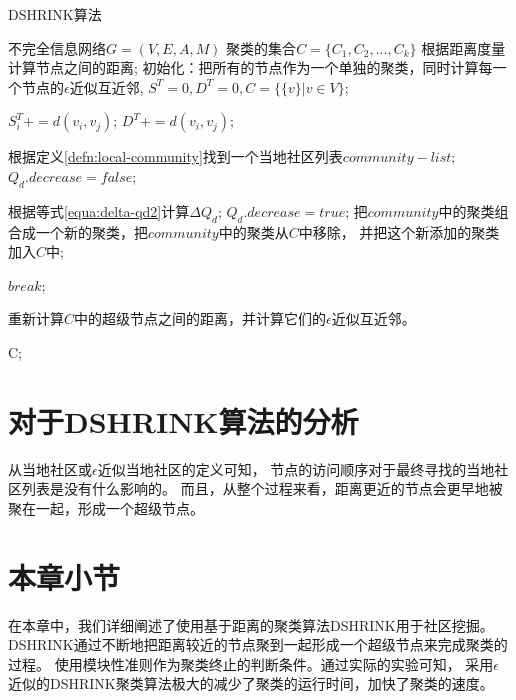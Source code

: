 \begin{algorithm}[htb]
    \caption{DSHRINK算法}
    \label{algo:dshrink}
    \begin{algorithmic}[1]
        \Require
        不完全信息网络$G = (V, E, A, M)$
        \Ensure
        聚类的集合$C = \{C_1, C_2, ..., C_k\}$
        \State 根据距离度量计算节点之间的距离;
        \State 初始化：把所有的节点作为一个单独的聚类，同时计算每一个节点的$\epsilon$近似互近邻,
        $S^T = 0, D^T = 0, C = \{\{v\} | v \in V \}$;

                \State $S_i^T += d(v_i, v_j)$;
                \State $D^T += d(v_i, v_j)$;
            \EndFor
        \EndFor

            \State 根据定义\ref{defn:local-community}找到一个当地社区列表$community-list$;
            \State $Q_d.decrease = false$;

                \State 根据等式\ref{equa:delta-qd2}计算$\Delta Q_d$;
                    \State $Q_d.decrease = true$;
                    \State 把$community$中的聚类组合成一个新的聚类，把$community$中的聚类从$C$中移除，
                    并把这个新添加的聚类加入$C$中;
                \EndIf
            \EndFor

                \State $break$;
            \EndIf

            \State 重新计算$C$中的超级节点之间的距离，并计算它们的$\epsilon$近似互近邻。
        \EndWhile

        \Return C;

    \end{algorithmic}
\end{algorithm}


\section{对于DSHRINK算法的分析}

从当地社区或$\epsilon$近似当地社区的定义可知，
节点的访问顺序对于最终寻找的当地社区列表是没有什么影响的。
而且，从整个过程来看，距离更近的节点会更早地被聚在一起，形成一个超级节点。

\section{本章小节}

在本章中，我们详细阐述了使用基于距离的聚类算法DSHRINK用于社区挖掘。
DSHRINK通过不断地把距离较近的节点聚到一起形成一个超级节点来完成聚类的过程。
使用模块性准则作为聚类终止的判断条件。通过实际的实验可知，
采用$\epsilon$近似的DSHRINK聚类算法极大的减少了聚类的运行时间，加快了聚类的速度。
